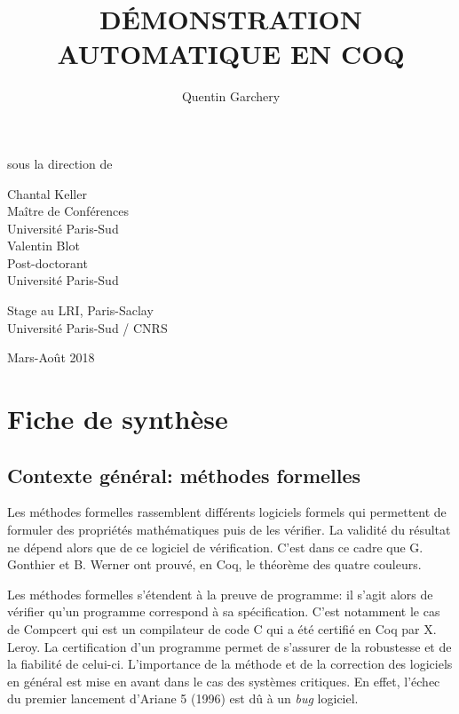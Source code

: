\documentclass[11pt]{article}
\title{ {\Large \textbf{DÉMONSTRATION AUTOMATIQUE EN COQ}} }
\date{}
\author{Quentin Garchery}
\begin{document}
\maketitle
\thispagestyle{empty}

\begin{center}
\normalsize sous la direction de \\

\vspace{3mm}

\begin{multicols}{2}
\large Chantal Keller \\
Maître de Conférences\\
Université Paris-Sud \\

\large Valentin Blot \\
Post-doctorant\\
Université Paris-Sud
\end{multicols}

\vspace{7mm}

\Large{Stage au LRI, Paris-Saclay\\
Université Paris-Sud / CNRS \\}

\vspace{5mm}

\normalsize Mars-Août 2018

\end{center}


\vspace{2cm}


\section{Fiche de synthèse}

\subsection{Contexte général: méthodes formelles}

Les méthodes formelles rassemblent différents logiciels formels qui permettent de formuler des propriétés mathématiques puis de les vérifier. La validité du résultat ne dépend alors que de ce logiciel de vérification. C'est dans ce cadre que G. Gonthier et B. Werner ont prouvé, en Coq, le théorème des quatre couleurs.\medbreak

Les méthodes formelles s'étendent à la preuve de programme: il s'agit alors de vérifier qu'un programme correspond à sa spécification. C'est notamment le cas de Compcert \cite{compcert} qui est un compilateur de code C qui a été certifié en Coq par X. Leroy. La certification d'un programme permet de s'assurer de la robustesse et de la fiabilité de celui-ci. L'importance de la méthode et de la correction des logiciels en général est mise en avant dans le cas des systèmes critiques. En effet, l'échec du premier lancement d'Ariane 5 (1996) est dû à un \textit{bug} logiciel. 
\end{document}
